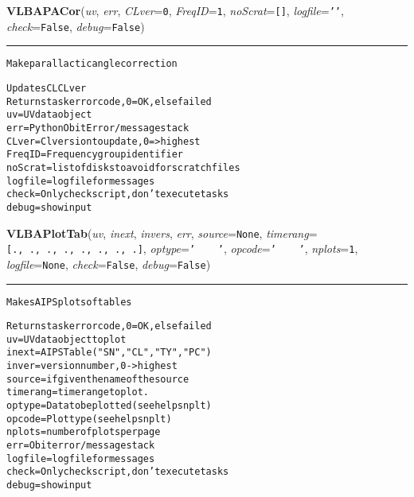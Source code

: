     \begin{boxedminipage}{\textwidth}

    \raggedright \textbf{VLBAPACor}(\textit{uv}, \textit{err}, \textit{CLver}=\texttt{0\-}, \textit{FreqID}=\texttt{1\-}, \textit{noScrat}=\texttt{[\-]\-}, \textit{logfile}=\texttt{'\-'\-}, \textit{check}=\texttt{F\-a\-l\-s\-e\-}, \textit{debug}=\texttt{F\-a\-l\-s\-e\-})

    \vspace{-1.5ex}

    \rule{\textwidth}{0.5\fboxrule}
\begin{alltt}
Make parallactic angle correction

Updates CL CLver
Returns task error code, 0=OK, else failed
uv         = UV data object
err        = Python Obit Error/message stack
CLver      = Cl version to update, 0={\textgreater} highest
FreqID     = Frequency group identifier
noScrat  = list of disks to avoid for scratch files
logfile    = logfile for messages
check      = Only check script, don't execute tasks
debug      = show input\end{alltt}

    \vspace{1ex}

    \end{boxedminipage}

    \label{VLBACal:VLBAPlotTab}
    \vspace{0.5ex}

    \begin{boxedminipage}{\textwidth}

    \raggedright \textbf{VLBAPlotTab}(\textit{uv}, \textit{inext}, \textit{invers}, \textit{err}, \textit{source}=\texttt{N\-o\-n\-e\-}, \textit{timerang}=\texttt{[\-.\-,\-~\-.\-,\-~\-.\-,\-~\-.\-,\-~\-.\-,\-~\-.\-,\-~\-.\-,\-~\-.\-]\-}, \textit{optype}=\texttt{'\-~\-~\-~\-~\-'\-}, \textit{opcode}=\texttt{'\-~\-~\-~\-~\-'\-}, \textit{nplots}=\texttt{1\-}, \textit{logfile}=\texttt{N\-o\-n\-e\-}, \textit{check}=\texttt{F\-a\-l\-s\-e\-}, \textit{debug}=\texttt{F\-a\-l\-s\-e\-})

    \vspace{-1.5ex}

    \rule{\textwidth}{0.5\fboxrule}
\begin{alltt}
Makes AIPS plots of tables

Returns task error code, 0=OK, else failed
uv       = UV data object to plot
inext    = AIPS Table ("SN", "CL", "TY", "PC")
inver    = version number, 0-{\textgreater} highest
source   = if given the name of the source
timerang = timerange to plot.
optype   = Data to be plotted (see help snplt)
opcode   = Plot type (see help snplt)
nplots   = number of plots per page
err      = Obit error/message stack
logfile  = logfile for messages
check    = Only check script, don't execute tasks
debug    = show input\end{alltt}

    \vspace{1ex}

    \end{boxedminipage}


